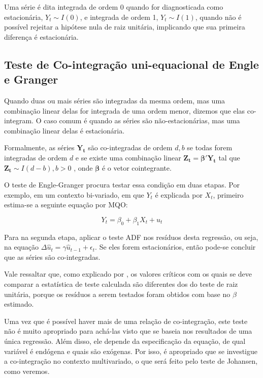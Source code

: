\documentclass[a4paper,
               article,
               12pt,
               openany,
               oneside,
               english,
               brazil]{abntex2}
\numberwithin{equation}{section}
\begin{document}
    Uma série é dita integrada de ordem 0 quando for diagnosticada como estacionária, $ Y_t \sim I(0) $, e integrada de ordem 1, $ Y_t \sim I(1) $, quando não é possível rejeitar a hipótese nula de raiz unitária, implicando que sua primeira diferença é estacionária.

    \subsection{Teste de Co-integração uni-equacional de Engle e Granger}

    Quando duas ou mais séries são integradas da mesma ordem, mas uma combinação linear delas for integrada de uma ordem menor, dizemos que elas co-integram. O caso comum é quando as séries são não-estacionárias, mas uma combinação linear delas é estacionária.
    
    Formalmente, as séries $ \mathbf{Y_t} $ são co-integradas de ordem $ d, b $ se todas forem integradas de ordem $ d $ e se existe uma combinação linear $ \mathbf{Z_t} = \pmb{\beta}'\mathbf{Y_t} $ tal que $ \mathbf{Z_t} \sim I(d - b), b > 0 $ \cite[p.~245]{lutkepool}, onde $ \pmb{\beta} $ é o vetor cointegrante.

    O teste de Engle-Granger procura testar essa condição em duas etapas. Por exemplo, em um contexto bi-variado, em que $ Y_t $ é explicada por $ X_t $, primeiro estima-se a seguinte equação por MQO:

    \begin{equation}
        Y_t = \beta_0 + \beta_1 X_t + u_t \label{engle-granger}
    \end{equation}

    Para na segunda etapa, aplicar o teste ADF nos resíduos desta regressão, ou seja, na equação $ \Delta \hat{u}_t = \gamma \hat{u}_{t-1} + \epsilon_{t} $. Se eles forem estacionários, então pode-se concluir que as séries são co-integradas.

    Vale ressaltar que, como explicado por \textcite[p.~756]{gujarati}, os valores críticos com os quais se deve comparar a estatística de teste calculada são diferentes dos do teste de raiz unitária, porque os resíduos a serem testados foram obtidos com base no $ \beta $ estimado.

    Uma vez que é possível haver mais de uma relação de co-integração, este teste não é muito apropriado para achá-las visto que se baseia nos resultados de uma única regressão. Além disso, ele depende da especificação da equação, de qual variável é endógena e quais são exógenas. Por isso, é apropriado que se investigue a co-integração no contexto multivariado, o que será feito pelo teste de Johansen, como veremos.
\end{document}

